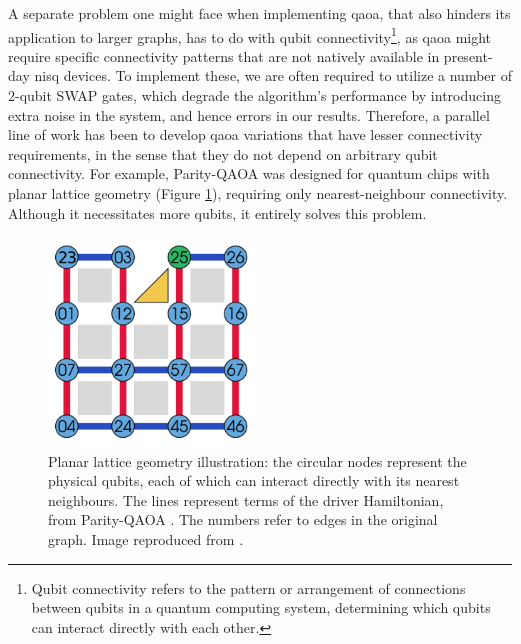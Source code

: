 A separate problem one might face when implementing \acrshort{qaoa}, that also hinders its application to larger graphs, has to do with qubit connectivity\footnote{Qubit connectivity refers to the pattern or arrangement of connections between qubits in a quantum computing system, determining which qubits can interact directly with each other.}, as \acrshort{qaoa} might require specific connectivity patterns that are not natively available in present-day \acrshort{nisq} devices. To implement these, we are often required to utilize a number of $2$-qubit SWAP gates, which degrade the algorithm's performance by introducing extra noise in the system, and hence errors in our results. Therefore, a parallel line of work has been to develop \acrshort{qaoa} variations that have lesser connectivity requirements, in the sense that they do not depend on arbitrary qubit connectivity. For example, Parity-QAOA \cite{ender2022modular,Ender2023parityquantum} was designed for quantum chips with planar lattice geometry (Figure \ref{fig:Planar_lattice_geometry}), requiring only nearest-neighbour connectivity. Although it necessitates more qubits, it entirely solves this problem.

\begin{figure}[H]
  \centering
  \includegraphics[width=0.5\textwidth]{Figures/Diagrams/Planar_lattice_geometry.png}
  \caption{Planar lattice geometry illustration: the circular nodes represent the physical qubits, each of which can interact directly with its nearest neighbours. The lines represent terms of the driver Hamiltonian, from Parity-QAOA \cite{ender2022modular}. The numbers refer to edges in the original graph. Image reproduced from \cite{ender2022modular}.}
  \label{fig:Planar_lattice_geometry}
\end{figure}

